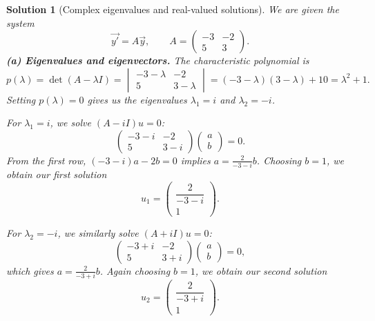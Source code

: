 \documentclass{article}
\newtheorem{solution}{Solution}
\begin{document}
\begin{solution}[Complex eigenvalues and real-valued solutions]
    We are given the system
    \[\vec{y'} = A\vec{y},\qquad A = \begin{pmatrix}-3 & -2 \\ 5 & 3\end{pmatrix}.\]
    \textbf{(a) Eigenvalues and eigenvectors.}
    The characteristic polynomial is
    \[p(\lambda) = \det(A-\lambda I) = \begin{vmatrix}
    -3-\lambda & -2 \\ 5 & 3-\lambda\end{vmatrix} = (-3-\lambda)(3-\lambda)+10 = \lambda^2 + 1.\]
    Setting $p(\lambda)=0$ gives us the eigenvalues $\lambda_1 = i$ and $\lambda_2 = -i$.
    
    For $\lambda_1=i$, we solve $(A-iI)u=0$:
    \[\begin{pmatrix}-3-i & -2 \\ 5 & 3-i\end{pmatrix}\begin{pmatrix}a \\ b\end{pmatrix}=0.\]
    From the first row, $(-3-i)a - 2b = 0$ implies $a = \frac{2}{-3-i} b$. Choosing $b=1$, we obtain our first solution
    \[u_1 = \begin{pmatrix}\dfrac{2}{-3-i}\\1\end{pmatrix}.\]

    For $\lambda_2=-i$, we similarly solve $(A+iI)u=0$:
    \[\begin{pmatrix}-3+i & -2 \\ 5 & 3+i\end{pmatrix}\begin{pmatrix}a \\ b\end{pmatrix}=0,\]
    which gives $a = \frac{2}{-3+i} b$. Again choosing $b=1$, we obtain our second solution
    \[u_2 = \begin{pmatrix}\dfrac{2}{-3+i}\\1\end{pmatrix}.\]


\end{solution}
\end{document}
